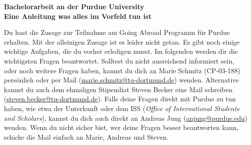 \documentclass[
  paper=a4,
  fontsize=12pt,
  DIV=16,
  headheight=52pt,
  footheight=45pt,
  headinclude,
  parskip=full,
]{scrartcl}
\date{\today}
\begin{document}
\textbf{\Huge\sffamily Bachelorarbeit an der Purdue University}\\[0.5\baselineskip]
\textbf{\Large\sffamily Eine Anleitung was alles im Vorfeld tun ist}

Du hast die Zusage zur Teilnahme am Going Abroad Programm für Purdue erhalten.
Mit der alleinigen Zusage ist es leider nicht getan.
Es gibt noch einige wichtige Aufgaben, die du vorher erledigen musst.
Im folgenden werden dir die wichtigsten Fragen beantwortet.
Solltest du nicht ausreichend informiert sein, oder noch weitere Fragen haben,
kannst du dich an Marie Schmitz (CP-03-188) persönlich oder per Mail
(\href{mailto:marie.schmitz@tu-dortmund.de}{marie.schmitz@tu-dortmund.de}) wenden.
Alternative kannst du auch dem ehmaligen Stipendiat Steven Becker eine Mail
schreiben (\href{mailto:steven.becker@tu-dortmund.de}{steven.becker@tu-dortmund.de}).
Falls deine Fragen direkt mit Purdue zu tun haben, wie etwa der Unterkunft oder
dem ISS (\textit{Office of International Students and Scholars}), kannst du dich auch direkt an Andreas Jung (\href{mailto:anjung@purdue.edu}{anjung@purdue.edu}) wenden.
Wenn du nicht sicher bist, wer deine Fragen besser beantworten kann, schicke die Mail einfach an Marie, Andreas und Steven.
\end{document}
